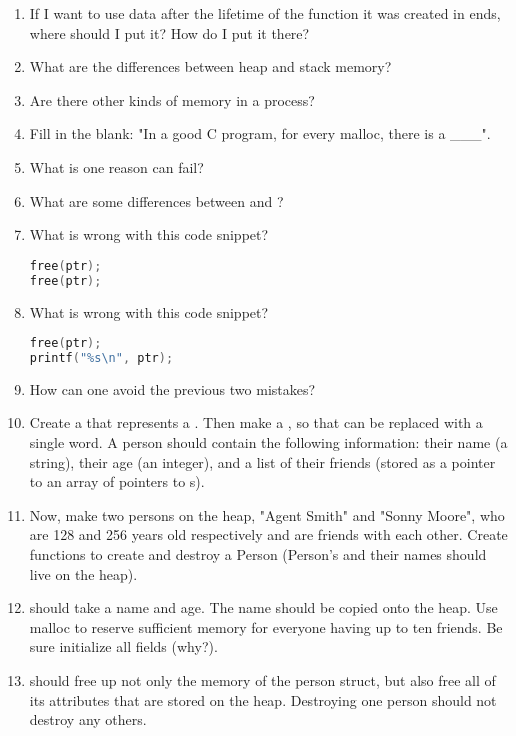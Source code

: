\begin{enumerate}
\item If I want to use data after the lifetime of the function it was created in ends, where should I put it? How do I put it there?
\item What are the differences between heap and stack memory?
\item Are there other kinds of memory in a process?
\item Fill in the blank: "In a good C program, for every malloc, there is a \_\_\_".
\item What is one reason  can fail?
\item What are some differences between  and ?
\item What is wrong with this code snippet?
\begin{lstlisting}[language=C]
free(ptr);
free(ptr);
\end{lstlisting}
\item What is wrong with this code snippet?
\begin{lstlisting}[language=C]
free(ptr);
printf("%s\n", ptr);
\end{lstlisting}
\item How can one avoid the previous two mistakes?
\item Create a  that represents a .
  Then make a , so that  can be replaced with a single word.
  A person should contain the following information: their name (a string), their age (an integer), and a list of their friends (stored as a pointer to an array of pointers to s).
\item Now, make two persons on the heap, "Agent Smith" and "Sonny Moore", who are 128 and 256 years old respectively and are friends with each other.
Create functions to create and destroy a Person (Person's and their names should live on the heap).
\item {} should take a name and age.
  The name should be copied onto the heap.
  Use malloc to reserve sufficient memory for everyone having up to ten friends.
  Be sure initialize all fields (why?).
\item {} should free up not only the memory of the person struct, but also free all of its attributes that are stored on the heap. Destroying one person should not destroy any others.
\end{enumerate}

